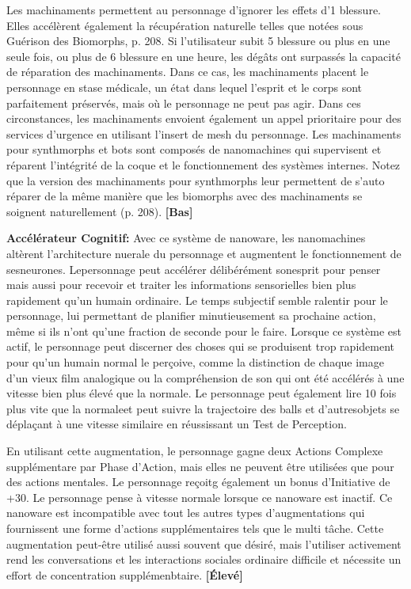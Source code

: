 {{Les machinaments permettent au personnage d'ignorer les effets d'1 blessure. Elles accélèrent également la récupération naturelle telles que notées sous Guérison des Biomorphs, p. 208. Si l'utilisateur subit 5 blessure ou plus en une seule fois, ou plus de 6 blessure en une heure, les dégâts ont surpassés la capacité de réparation des machinaments. Dans ce cas, les machinaments placent le personnage en stase médicale, un état dans lequel l'esprit et le corps sont parfaitement préservés, mais où le personnage ne peut pas agir. Dans ces circonstances, les machinaments envoient également un appel prioritaire pour des services d'urgence en utilisant l'insert de mesh du personnage. Les machinaments pour synthmorphs et bots sont composés de nanomachines qui supervisent et réparent l'intégrité de la coque et le fonctionnement des systèmes internes. Notez que la version des machinaments pour synthmorphs leur permettent de s'auto réparer de la même manière que les biomorphs avec des machinaments se soignent naturellement (p. 208). \textbf{[Bas]} 

\textbf{Accélérateur Cognitif:} Avec ce système de nanoware, les nanomachines altèrent l'architecture nuerale du personnage et augmentent le fonctionnement de sesneurones. Lepersonnage peut accélérer délibérément sonesprit pour penser mais aussi pour recevoir et traiter les informations sensorielles bien plus rapidement qu'un humain ordinaire. Le temps subjectif semble ralentir pour le personnage, lui permettant de planifier minutieusement sa prochaine action, même si ils n'ont qu'une fraction de seconde pour le faire. Lorsque ce système est actif, le personnage peut discerner des choses qui se produisent trop rapidement pour qu'un humain normal le perçoive, comme la distinction de chaque image d'un vieux film analogique ou la compréhension de son qui ont été accélérés à une vitesse bien plus élevé que la normale. Le personnage peut également lire 10 fois plus vite que la normaleet peut suivre la trajectoire des balls et d'autresobjets se déplaçant à une vitesse similaire en réussissant un Test de Perception. 

En utilisant cette augmentation, le personnage gagne deux Actions Complexe supplémentare par Phase d'Action, mais elles ne peuvent être utilisées que pour des actions mentales. Le personnage reçoitg également un bonus d'Initiative de +30. Le personnage pense à vitesse normale lorsque ce nanoware est inactif. Ce nanoware est incompatible avec tout les autres types d'augmentations qui fournissent une forme d'actions supplémentaires tels que le multi tâche. Cette augmentation peut-être utilisé aussi souvent que désiré, mais l'utiliser activement rend les conversations et les interactions sociales ordinaire difficile et nécessite un effort de concentration supplémenbtaire. \textbf{[Élevé]} 

}}
